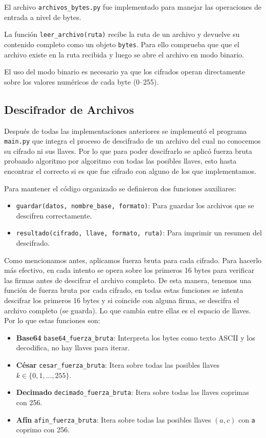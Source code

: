 \documentclass[12pt, a4paper]{article}
\begin{document}
El archivo \texttt{archivos\_bytes.py} fue implementado para manejar las operaciones
de entrada a nivel de bytes.

La función \texttt{leer\_archivo(ruta)} recibe la ruta de un archivo y devuelve su contenido 
completo como un objeto \texttt{bytes}. Para ello comprueba que que el archivo existe en la ruta
recibida y luego se abre el archivo en modo binario.

El uso del modo binario es necesario ya que los cifrados
operan directamente sobre los valores numéricos de cada byte (0--255).

\subsection{Descifrador de Archivos}

Después de todas las implementaciones anteriores se implementó el programa \texttt{main.py} que
integra el proceso de descifrado de un archivo del cual no conocemos su cifrado ni sus llaves. 
Por lo que para poder descifrarlo se aplicó fuerza bruta probando algoritmo por algoritmo con 
todas las posibles llaves, esto hasta encontrar el correcto si es que fue cifrado con alguno de los
que implementamos.

Para mantener el código organizado se definieron dos funciones auxiliares:

\begin{itemize}
    \item \texttt{guardar(datos, nombre\_base, formato)}: Para guardar los archivos que se descifren correctamente.
    \item \texttt{resultado(cifrado, llave, formato, ruta)}: Para imprimir un resumen del descifrado.
\end{itemize}

Como mencionamos antes, aplicamos fuerza bruta para cada cifrado. Para hacerlo más efectivo, en cada intento
se opera sobre los primeros 16 bytes para verificar las firmas antes de descifrar el archivo completo. De esta manera,
tenemos una función de fuerza bruta por cada cifrado, en todas estas funciones se intenta descifrar los primeros
16 bytes y si coincide con alguna firma, se descifra el archivo completo (se guarda). Lo que cambia entre ellas es el espacio de 
llaves. Por lo que estas funciones son:

\begin{itemize}
    \item \textbf{Base64} \texttt{base64\_fuerza\_bruta}: Interpreta los bytes como texto ASCII y los decodifica,
    no hay llaves para iterar.

    \item \textbf{César} \texttt{cesar\_fuerza\_bruta}: Itera sobre todas las posibles llaves $k \in \{0, 1, \dots, 255\}$.

    \item \textbf{Decimado} \texttt{decimado\_fuerza\_bruta}: Itera sobre todas las llaves coprimas con 256.

    \item \textbf{Afín} \texttt{afin\_fuerza\_bruta}: Itera sobre todas las posibles llaves $(a, c)$ con
    \texttt{a} coprimo con 256.
\end{itemize}
\end{document}
